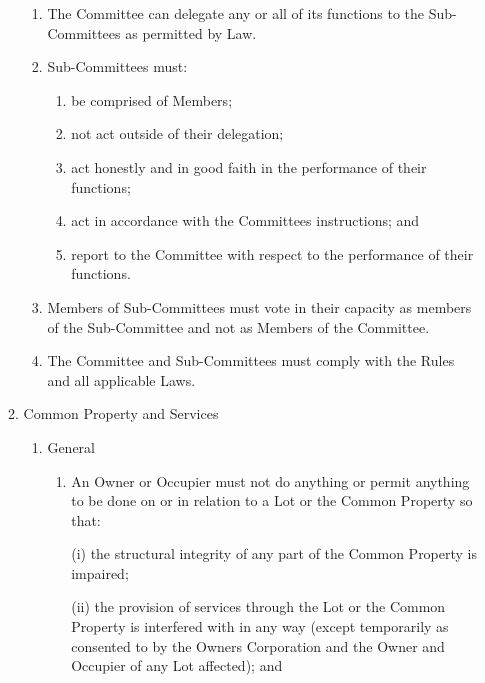 \documentclass{article}
\begin{document}
\begin{enumerate}[label=\arabic*.]
\begin{enumerate}[label=\arabic{enumi}.\arabic*.]
\begin{enumerate}[label=(\arabic*)]
\item  The Committee can delegate any or all of its functions to the Sub-Committees as permitted by Law.

\item  Sub-Committees must:

\begin{enumerate}[label=(\alph*)]

\item  be comprised of Members;

\item  not act outside of their delegation;

\item  act honestly and in good faith in the performance of their functions;

\item  act in accordance with the Committees instructions; and

\item  report to the Committee with respect to the performance of their functions.

\end{enumerate}

\item  Members of Sub-Committees must vote in their capacity as members of the Sub-Committee and not as Members of the Committee.

\item  The Committee and Sub-Committees must comply with the Rules and all applicable Laws.

\end{enumerate}

\item  Common Property and Services

\begin{enumerate}[label=(\arabic*)]

\item  General

\begin{enumerate}[label=(\alph*)]

\item  An Owner or Occupier must not do anything or permit anything to be done on or in relation to a Lot or the Common Property so that:

(i) the structural integrity of any part of the Common Property is impaired;

(ii) the provision of services through the Lot or the Common Property is interfered with in any way (except temporarily as consented to by the Owners Corporation and the Owner and Occupier of any Lot affected); and


\end{enumerate}
\end{enumerate}
\end{enumerate}
\end{enumerate}
\end{document}
